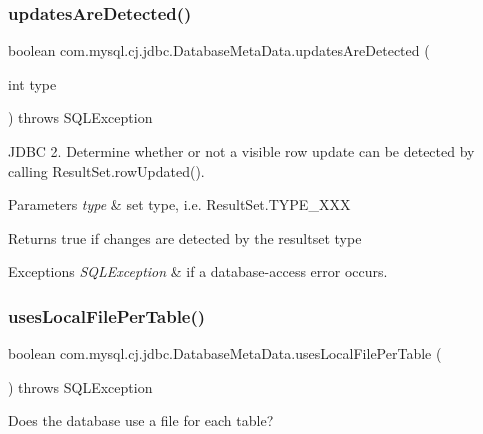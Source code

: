 \subsubsection{\texorpdfstring{updates\+Are\+Detected()}{updatesAreDetected()}}
{\footnotesize\ttfamily boolean com.\+mysql.\+cj.\+jdbc.\+Database\+Meta\+Data.\+updates\+Are\+Detected (\begin{DoxyParamCaption}\item[{int}]{type }\end{DoxyParamCaption}) throws S\+Q\+L\+Exception}

J\+D\+BC 2. Determine whether or not a visible row update can be detected by calling Result\+Set.\+row\+Updated().


\begin{DoxyParams}{Parameters}
{\em type} & set type, i.\+e. Result\+Set.\+T\+Y\+P\+E\+\_\+\+X\+XX \\
\hline
\end{DoxyParams}
\begin{DoxyReturn}{Returns}
true if changes are detected by the resultset type 
\end{DoxyReturn}

\begin{DoxyExceptions}{Exceptions}
{\em S\+Q\+L\+Exception} & if a database-\/access error occurs. \\
\hline
\end{DoxyExceptions}
\mbox{\label{classcom_1_1mysql_1_1cj_1_1jdbc_1_1_database_meta_data_ae6de1bc482f566e7e91fc7ad15b21d7d}} 
\subsubsection{\texorpdfstring{uses\+Local\+File\+Per\+Table()}{usesLocalFilePerTable()}}
{\footnotesize\ttfamily boolean com.\+mysql.\+cj.\+jdbc.\+Database\+Meta\+Data.\+uses\+Local\+File\+Per\+Table (\begin{DoxyParamCaption}{ }\end{DoxyParamCaption}) throws S\+Q\+L\+Exception}

Does the database use a file for each table?

